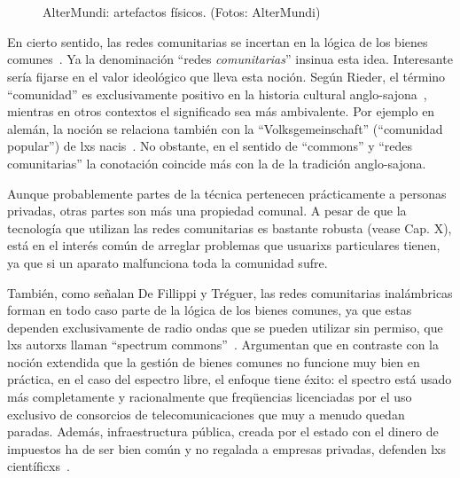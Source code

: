 \begin{figure}[h]
\centering
{} \quad
{} \\
 \quad
{} \\
 \quad
{}
\caption[A number of pictures.]{AlterMundi: artefactos físicos. (Fotos: AlterMundi)} %
\label{fig:artifacts}
\end{figure}


En cierto sentido, las redes comunitarias se incertan en la lógica de los bienes comunes~\autocite{FiTre2015}.
Ya la denominación ``redes \textit{comunitarias}'' insinua esta idea.
Interesante sería fijarse en el valor ideológico que lleva esta noción.
Según Rieder, el término ``comunidad'' es exclusivamente positivo en la historia cultural anglo-sajona~\autocite{Rieder2012}, mientras en otros contextos el significado sea más ambivalente.
Por ejemplo en alemán, la noción se relaciona también con la ``Volksgemeinschaft'' (``comunidad popular'') de lxs nacis~\autocite{Rieder2012}. %
No obstante, en el sentido de ``commons'' y ``redes comunitarias'' la conotación coincide más con la de la tradición anglo-sajona.

Aunque probablemente partes de la técnica pertenecen prácticamente a personas privadas, otras partes son más una propiedad comunal.
A pesar de que la tecnología que utilizan las redes comunitarias es bastante robusta (vease Cap. X), está en el interés común de arreglar problemas que usuarixs particulares tienen, ya que si un aparato malfunciona toda la comunidad sufre.

También, como señalan De Fillippi y Tréguer, las redes comunitarias inalámbricas forman en todo caso parte de la lógica de los bienes comunes, ya que estas dependen exclusivamente de radio ondas que se pueden utilizar sin permiso, que lxs autorxs llaman ``spectrum commons''~\autocite{FiTre2015}.
Argumentan que en contraste con la noción extendida que la gestión de bienes comunes no funcione muy bien en práctica, en el caso del espectro libre, el enfoque tiene éxito:
el spectro está usado más completamente y racionalmente que freqüencias licenciadas por el uso exclusivo de consorcios de telecomunicaciones que muy a menudo quedan paradas.
Además, infraestructura pública, creada por el estado con el dinero de impuestos ha de ser bien común y no regalada a empresas privadas, defenden lxs científicxs~\autocite{FiTre2015}.

